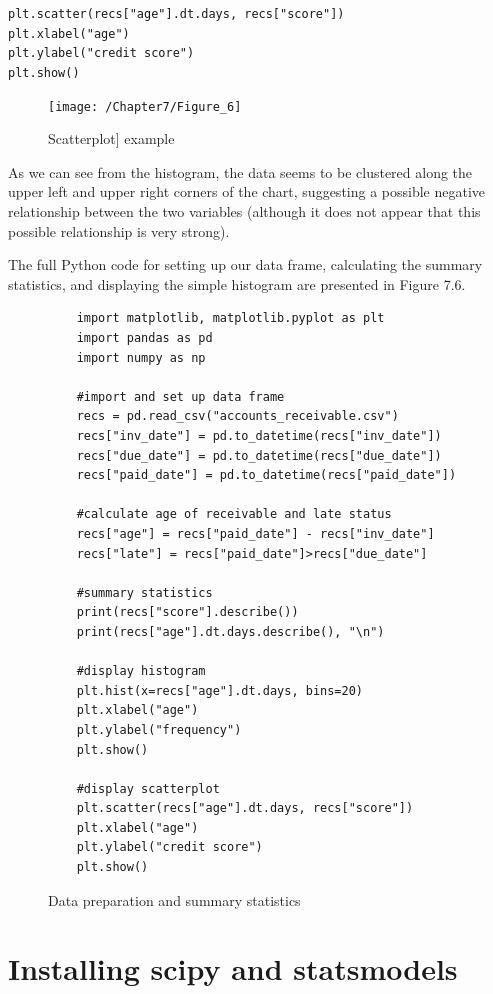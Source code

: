 \documentclass{book}
\begin{document}
\texttt{plt.scatter(recs["age"].dt.days, recs["score"])\\
	plt.xlabel("age")\\
	plt.ylabel("credit score")\\
	plt.show()
}

\begin{figure}[h]
	\caption{Scatterplot] example}
	\centering\texttt{[image: /Chapter7/Figure\_6]}
\end{figure}

As we can see from the histogram, the data seems to be clustered along the upper left and upper right corners of the chart, suggesting a possible negative relationship between the two variables (although it does not appear that this possible relationship is very strong).

The full Python code for setting up our data frame, calculating the summary statistics, and displaying the simple histogram are presented in Figure 7.6.

\begin{figure}[h]
	\caption{Data preparation and summary statistics}
	\begin{lstlisting}
	import matplotlib, matplotlib.pyplot as plt
	import pandas as pd
	import numpy as np
	
	#import and set up data frame
	recs = pd.read_csv("accounts_receivable.csv")
	recs["inv_date"] = pd.to_datetime(recs["inv_date"])
	recs["due_date"] = pd.to_datetime(recs["due_date"])
	recs["paid_date"] = pd.to_datetime(recs["paid_date"])
	
	#calculate age of receivable and late status
	recs["age"] = recs["paid_date"] - recs["inv_date"]
	recs["late"] = recs["paid_date"]>recs["due_date"]
	
	#summary statistics
	print(recs["score"].describe())
	print(recs["age"].dt.days.describe(), "\n")
	
	#display histogram
	plt.hist(x=recs["age"].dt.days, bins=20)
	plt.xlabel("age")
	plt.ylabel("frequency")
	plt.show()
	
	#display scatterplot
	plt.scatter(recs["age"].dt.days, recs["score"])
	plt.xlabel("age")
	plt.ylabel("credit score")
	plt.show()
	\end{lstlisting}
\end{figure}

\section{Installing scipy and statsmodels}
\end{document}
